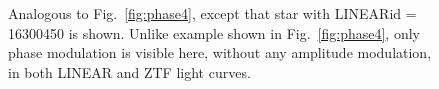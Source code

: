 \begin{figure}[ht]
    \centering
    \caption{Analogous to Fig.~\ref{fig:phase4}, except that star
    with LINEARid = 16300450 is shown. Unlike example shown in
    Fig.~\ref{fig:phase4},  only phase modulation is visible here,
    without any amplitude modulation, in both LINEAR and ZTF light curves.}
      \label{fig:phase5}
\end{figure}


